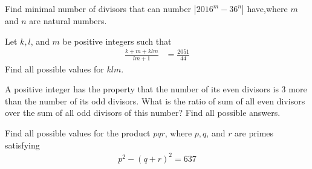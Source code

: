 \documentclass[problems.tex]{subfile}
\begin{document}
	\begin{problem}
		Find minimal number of divisors that can number $|2016^m-36^n|$ have,where $m$ and $n$ are natural numbers. %
	\end{problem}


	\begin{problem}
		Let $k, l$, and $m$ be positive integers such that
		\begin{align*}
			\frac{k+m+klm}{lm+1} &= \frac{2051}{44}
		\end{align*}
		Find all possible values for $klm$.
	\end{problem}


	\begin{problem}
		A positive integer has the property that the number of its even divisors is $3$ more than the number of its odd divisors. What is the ratio of sum of all even divisors over the sum of all odd divisors of this number? Find all possible answers.
	\end{problem}



	\begin{problem}
		Find all possible values for the product $pqr$, where $p, q$, and $r$ are primes satisfying
		\begin{align*}
			p^2 - (q+r)^2 = 637
		\end{align*}
	\end{problem}
\end{document}
